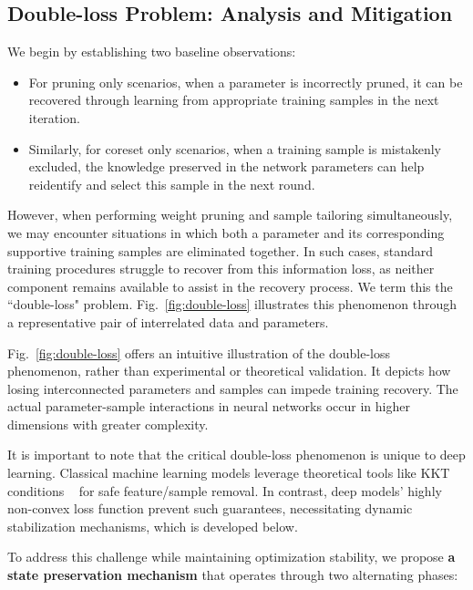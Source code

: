 \subsection{Double-loss Problem: Analysis and Mitigation}
We begin by establishing two baseline observations:
\begin{itemize}
    \item For pruning only scenarios, when a parameter is incorrectly pruned, it can be recovered through learning from appropriate training samples in the next iteration.
    \item Similarly, for coreset only scenarios, when a training sample is mistakenly excluded, the knowledge preserved in the network parameters can help reidentify and select this sample in the next round.
\end{itemize}

However, when performing weight pruning and sample tailoring simultaneously, we may encounter situations in which both a parameter and its corresponding supportive training samples are eliminated together. In such cases, standard training procedures struggle to recover from this information loss, as neither component remains available to assist in the recovery process. We term this the “double-loss" problem. Fig.~\ref{fig:double-loss} illustrates this phenomenon through a representative pair of interrelated data and parameters.

\begin{remark}
    Fig.~\ref{fig:double-loss} offers an intuitive illustration of the double-loss phenomenon, rather than experimental or theoretical validation. It depicts how losing interconnected parameters and samples can impede training recovery. The actual parameter-sample interactions in neural networks occur in higher dimensions with greater complexity.
\end{remark}

\begin{remark}  
    It is important to note that the critical double-loss phenomenon is unique to deep learning. Classical machine learning models leverage theoretical tools like KKT conditions ~\cite{shibagaki2016simultaneous} for safe feature/sample removal. In contrast, deep models' highly non-convex loss function prevent such guarantees, necessitating dynamic stabilization mechanisms, which is developed below. 
\end{remark}

To address this challenge while maintaining optimization stability, we propose \textbf{a state preservation mechanism} that operates through two alternating phases:

